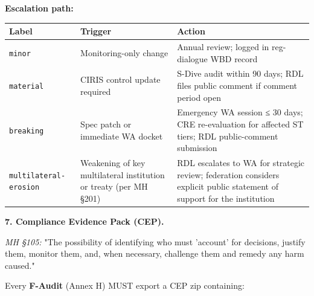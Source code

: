 \documentclass[11pt]{article}
\begin{document}
\textbf{Escalation path:}


{\footnotesize
\begin{longtable}{|p{5.33cm}|p{5.33cm}|p{5.33cm}|}\hline
\textbf{Label} & \textbf{Trigger} & \textbf{Action} \\ \hline\endhead
\texttt{minor} & Monitoring-only change & Annual review; logged in reg-dialogue WBD record \\ \hline
\texttt{material} & CIRIS control update required & S-Dive audit within 90 days; RDL files public comment if comment period open \\ \hline
\texttt{breaking} & Spec patch or immediate WA docket & Emergency WA session ≤ 30 days; CRE re-evaluation for affected ST tiers; RDL public-comment submission \\ \hline
\texttt{multilateral-erosion} & Weakening of key multilateral institution or treaty (per MH §201) & RDL escalates to WA for strategic review; federation considers explicit public statement of support for the institution \\ \hline
\end{longtable}}


\textbf{7. Compliance Evidence Pack (CEP).}


\textit{MH §105:} "The possibility of identifying who must 'account' for decisions, justify them, monitor them, and, when necessary, challenge them and remedy any harm caused."


Every \textbf{F-Audit} (Annex H) MUST export a CEP zip containing:
\end{document}
